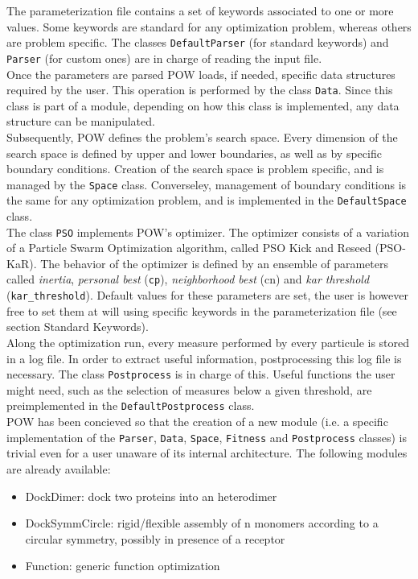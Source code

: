 \documentclass[a4paper, 12pt]{article}
\begin{document}
The parameterization file contains a set of keywords associated to one or more values. Some keywords are standard for any optimization problem, whereas others are problem specific. The classes \texttt{DefaultParser} (for standard keywords) and \texttt{Parser} (for custom ones) are in charge of reading the input file.\\
Once the parameters are parsed POW loads, if needed, specific data structures required by the user. This operation is performed by the class \texttt{Data}. Since this class is part of a module, depending on how this class is implemented, any data structure can be manipulated.\\
Subsequently, POW defines the problem's search space. Every dimension of the search space is defined by upper and lower boundaries, as well as by specific boundary conditions. Creation of the search space is problem specific, and is managed by the \texttt{Space} class. Converseley, management of boundary conditions is the same for any optimization problem, and is implemented in the \texttt{DefaultSpace} class.\\
The class \texttt{PSO} implements POW's optimizer. The optimizer consists of a variation of a Particle Swarm Optimization algorithm, called PSO Kick and Reseed (PSO-KaR). The behavior of the optimizer is defined by an ensemble of parameters called \emph{inertia}, \emph{personal best} (\texttt{cp}), \emph{neighborhood best} (cn) and \emph{kar threshold} (\texttt{kar\_threshold}). Default values for these parameters are set, the user is however free to set them at will using specific keywords in the parameterization file (see section Standard Keywords).\\ 
Along the optimization run, every measure performed by every particule is stored in a log file. In order to extract useful information, postprocessing this log file is necessary. The class \texttt{Postprocess} is in charge of this. Useful functions the user might need, such as the selection of measures below a given threshold, are preimplemented in the \texttt{DefaultPostprocess} class.\\

POW has been concieved so that the creation of a new module (i.e. a specific implementation of the \texttt{Parser}, \texttt{Data}, \texttt{Space}, \texttt{Fitness} and \texttt{Postprocess} classes) is trivial even for a user unaware of its internal architecture. The following modules are already available:

\begin{itemize}
\item DockDimer: dock two proteins into an heterodimer
\item DockSymmCircle: rigid/flexible assembly of n monomers according to a circular symmetry, possibly in presence of a receptor
\item Function: generic function optimization
\end{itemize}
\end{document}
